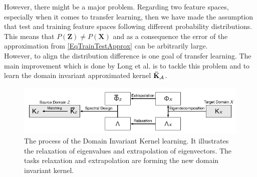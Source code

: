 However, there might be a major problem.
Regarding two feature spaces, especially when it comes to transfer learning, then we have made the assumption that test and training feature spaces following different probability distributions.
This means that $P(\mathbf{Z})\neq P(\mathbf{X})$ and as a consequence the error of the approximation from \eqref{EqTrainTestApprox} can be arbitrarily large.\cite{Long.2015}\\
However, to align the distribution difference is one goal of transfer learning.
The main improvement which is done by Long et al. is to tackle this problem and to learn the domain invariant approximated kernel $\mathbf{\bar{K}}_{\mathcal{A}}$.\cite{Long.2015}
\begin{figure}
	\centering
	\includegraphics[width=.8\linewidth]{figures/ProcessTKL.png}
	\caption[Tranfer Kernel Learning Process]{The process of the Domain Invariant Kernel learning. It illustrates the relaxation of eigenvalues and extrapolation of eigenvectors. The tasks relaxation and extrapolation are forming the new domain invariant kernel.\cite{Long.2015}}
	\label{FigTKLApp}
\end{figure}
